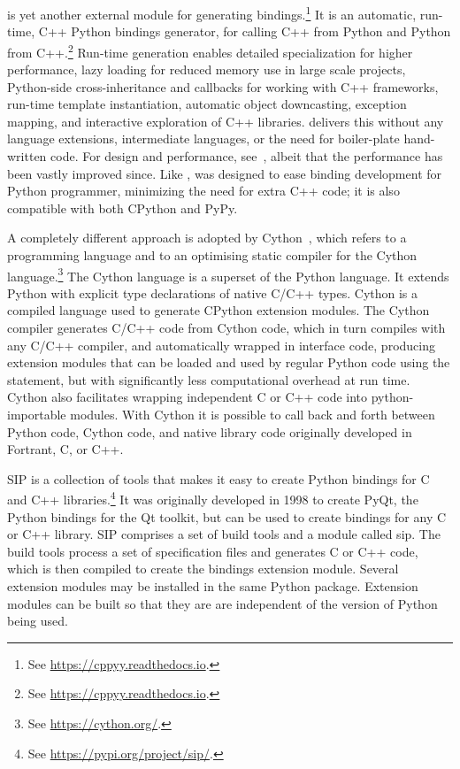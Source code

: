  is yet another external module for generating bindings.\footnote{See \url{https://cppyy.readthedocs.io}.} It is an automatic, run-time, C++ Python bindings generator, for calling C++ from Python and Python from C++.\footnote{See \url{https://cppyy.readthedocs.io}.} Run-time generation enables detailed specialization for higher performance, lazy loading for reduced memory use in large scale projects,
Python-side cross-inheritance and callbacks for working with C++ frameworks, run-time template instantiation, automatic object downcasting, exception mapping, and interactive exploration of C++ libraries.  delivers this without any language
extensions, intermediate languages, or the need for boiler-plate hand-written code. For design and performance, see~\cite{ld-hppcn-16}, albeit that the  performance has been vastly improved since.  Like ,  was designed to ease binding development for Python programmer,
minimizing the need for extra C++ code; it is also compatible with both CPython and PyPy.

A completely different approach is adopted by Cython~\cite{bbcds-cbbw-11}, which refers to a programming language and to an optimising static compiler for the Cython language.\footnote{See \url{https://cython.org/}.}  The Cython
language is a superset of the Python language. It extends Python with explicit type declarations of native C/C++ types.  Cython is a compiled language used to generate CPython extension modules.  The Cython compiler generates C/C++ code from Cython code, which in turn compiles with any C/C++ compiler, and automatically wrapped in interface code, producing extension modules that can be loaded and used by regular Python code using the  statement, but with significantly less computational overhead at run time. Cython also facilitates wrapping independent C or C++ code into
python-importable modules.  With Cython it is possible to call back and forth between Python code, Cython code, and native library code originally developed in Fortrant, C, or C++.

SIP is a collection of tools that makes it easy to create Python bindings for C and C++ libraries.\footnote{See \url{https://pypi.org/project/sip/}.}  It was originally developed in 1998 to create PyQt, the Python bindings for the Qt toolkit, but can be used to create bindings for any C or C++ library. SIP comprises a set of build tools and a module called sip. The build tools process a set of specification files and generates C or C++ code, which is then compiled to create the bindings extension module. Several extension modules may be installed in the same Python package. Extension modules can be built so that they are are independent of the version of Python being used.

